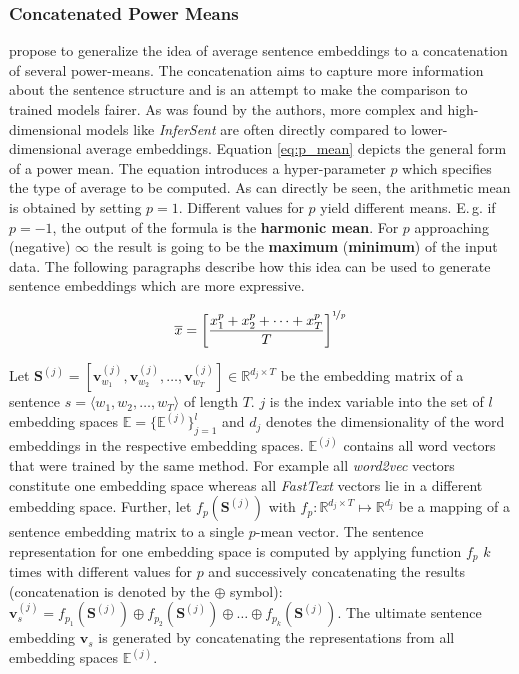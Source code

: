 \subsubsection{Concatenated Power Means}
\label{sec:concat_p_means}

\citep{Rueckle.2018} propose to generalize the idea of average sentence embeddings to a concatenation of several power-means. The concatenation aims to capture more information about the sentence structure and is an attempt to make the comparison to trained models fairer. As was found by the authors, more complex and high-dimensional models like \textit{InferSent} are often directly compared to lower-dimensional average embeddings. Equation \vref{eq:p_mean} depicts the general form of a power mean. The equation introduces a hyper-parameter $p$ which specifies the type of average to be computed. As can directly be seen, the arithmetic mean is obtained by setting $p = 1$. Different values for $p$ yield different means. E.\,g. if $p = -1$, the output of the formula is the \textbf{harmonic mean}. For $p$ approaching (negative) $\infty$ the result is going to be the \textbf{maximum} (\textbf{minimum}) of the input data. The following paragraphs describe how this idea can be used to generate sentence embeddings which are more expressive.

\begin{equation}
	\label{eq:p_mean}
	\overline{x} = \left[ \frac{x_1^p + x_2^p + \dots + x_T^p}{T} \right]^{\nicefrac{1}{p}}
\end{equation}

Let $\bm{S}^{(j)} = [\bm{v}_{w_1}^{(j)}, \bm{v}_{w_2}^{(j)}, \dots, \bm{v}_{w_T}^{(j)}] \in \mathbb{R}^{d_j \times T}$ be the embedding matrix of a sentence $s = \langle w_1, w_2, \dots, w_T \rangle$ of length $T$. $j$ is the index variable into the set of $l$ embedding spaces $\mathbb{E} = \{ \mathbb{E}^{(j)} \}_{j=1}^l$ and $d_j$ denotes the dimensionality of the word embeddings in the respective embedding spaces. $\mathbb{E}^{(j)}$ contains all word vectors that were trained by the same method. For example all \textit{word2vec} vectors constitute one embedding space whereas all \textit{FastText} vectors lie in a different embedding space. Further, let $f_p(\bm{S}^{(j)})$ with $f_p: \mathbb{R}^{d_j \times T} \mapsto \mathbb{R}^{d_j}$ be a mapping of a sentence embedding matrix to a single $p$-mean vector. The sentence representation for one embedding space is computed by applying function $f_p$ $k$ times with different values for $p$ and successively concatenating the results (concatenation is denoted by the $\oplus$ symbol): $\bm{v}_{s}^{(j)} = f_{p_1}\left(\bm{S}^{(j)}\right) \oplus f_{p_2}\left(\bm{S}^{(j)}\right) \oplus \dots \oplus f_{p_k}\left(\bm{S}^{(j)}\right)$. The ultimate sentence embedding $\bm{v}_s$ is generated by concatenating the representations from all embedding spaces $\mathbb{E}^{(j)}$.

